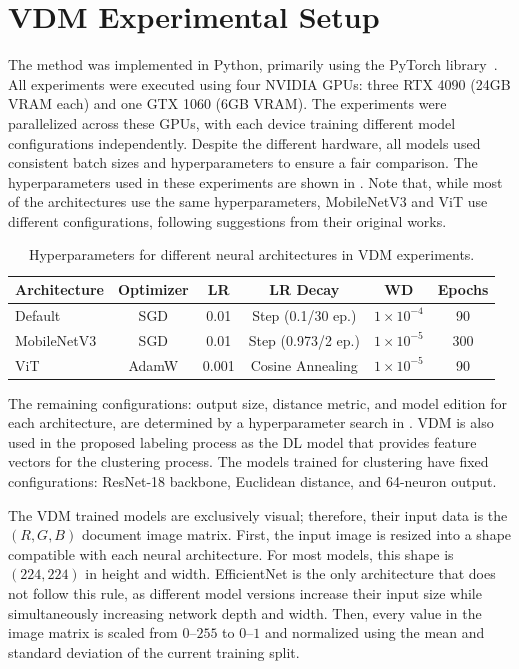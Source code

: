 \section{VDM Experimental Setup}
\label{sec:experimental_setup}

The method was implemented in Python, primarily using the PyTorch library~\cite{paszke_pytorch_2019}. All experiments were executed using four NVIDIA GPUs: three RTX 4090 (24GB VRAM each) and one GTX 1060 (6GB VRAM). The experiments were parallelized across these GPUs, with each device training different model configurations independently. Despite the different hardware, all models used consistent batch sizes and hyperparameters to ensure a fair comparison. The hyperparameters used in these experiments are shown in . Note that, while most of the architectures use the same hyperparameters, MobileNetV3 and \gls{ViT} use different configurations, following suggestions from their original works.

\begin{table}[htbp]
\centering
\caption{Hyperparameters for different neural architectures in VDM experiments.}
\label{tab:hyperparameters}
\begin{tabular}{lccccc}
\hline
\textbf{Architecture} & \textbf{Optimizer} & \textbf{LR} & \textbf{LR Decay} & \textbf{WD} & \textbf{Epochs} \\
\hline
Default     & SGD   & 0.01  & Step (0.1/30 ep.)     & $1 \times 10^{-4}$ & 90 \\
MobileNetV3 & SGD   & 0.01  & Step (0.973/2 ep.)    & $1 \times 10^{-5}$ & 300 \\
ViT         & AdamW & 0.001 & Cosine Annealing      & $1 \times 10^{-5}$ & 90 \\
\hline
\end{tabular}
\end{table}

The remaining configurations: output size, distance metric, and model edition for each architecture, are determined by a hyperparameter search in . \gls{VDM} is also used in the proposed labeling process as the \gls{DL} model that provides feature vectors for the clustering process. The models trained for clustering have fixed configurations: ResNet-18 backbone, Euclidean distance, and 64-neuron output.

The \gls{VDM} trained models are exclusively visual; therefore, their input data is the $(R, G, B)$ document image matrix. First, the input image is resized into a shape compatible with each neural architecture. For most models, this shape is $(224, 224)$ in height and width. EfficientNet is the only architecture that does not follow this rule, as different model versions increase their input size while simultaneously increasing network depth and width. Then, every value in the image matrix is scaled from $0\text{--}255$ to $0\text{--}1$ and normalized using the mean and standard deviation of the current training split.

